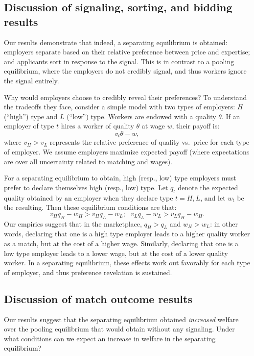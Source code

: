\subsection{Discussion of signaling, sorting, and bidding results}
\label{ssec:discussion1}

Our results demonstrate that indeed, a separating equilibrium is obtained: employers separate based on their relative preference between price and expertise; and applicants sort in response to the signal.  This is in contrast to a pooling equilibrium, where the employers do not credibly signal, and thus workers ignore the signal entirely.  

Why would employers choose to credibly reveal their preferences?  To understand the tradeoffs they face, consider a simple model with two types of employers: $H$ (``high'') type and $L$ (``low'') type.  Workers are endowed with a quality $\theta$.  If an employer of type $t$ hires a worker of quality $\theta$ at wage $w$, their payoff is:
\[ v_t \theta - w, \]
where $v_H > v_L$ represents the relative preference of quality vs.~price for each type of employer.  We assume employers maximize expected payoff (where expectations are over all uncertainty related to matching and wages).

For a separating equilibrium to obtain, high (resp., low) type employers must prefer to declare themselves high (resp., low) type.  Let $q_t$ denote the expected quality obtained by an employer when they declare type $t = H, L$, and let $w_t$ be the resulting.  Then these equilibrium conditions are that:
\[ v_H q_H - w_H > v_H q_L - w_L; \ \ \ v_L q_L - w_L > v_L q_H - w_H. \]
Our empirics suggest that in the marketplace, $q_H > q_L$ and $w_H > w_L$: in other words, declaring that one is a high type employer leads to a higher quality worker as a match, but at the cost of a higher wage.  Similarly, declaring that one is a low type employer leads to a lower wage, but at the cost of a lower quality worker.  In a separating equilibrium, these effects work out favorably for each type of employer, and thus preference revelation is sustained.


\subsection{Discussion of match outcome results}

Our results suggest that the separating equilibrium obtained {\em increased} welfare over the pooling equilibrium that would obtain without any signaling.  Under what conditions can we expect an increase in welfare in the separating equilibrium?

